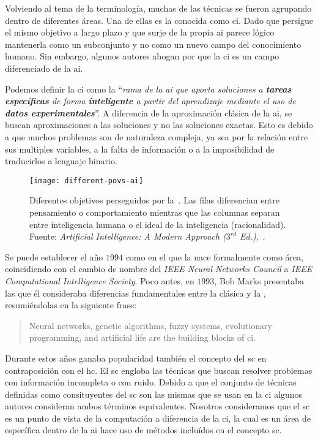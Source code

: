 Volviendo al tema de la terminología, muchas de las técnicas se fueron agrupando dentro de diferentes áreas. Una de ellas es la conocida como \acrlong{ci}. Dado que persigue el mismo objetivo a largo plazo y que surje de la propia \gls{ai} parece lógico mantenerla como un subconjunto y no como un nuevo campo del conocimiento humano. Sin embargo, algunos autores abogan por que la \gls{ci} es un campo diferenciado de la \gls{ai}.

Podemos definir la \acrlong{ci} como la \enquote{\textit{rama de la \gls{ai} que aporta soluciones a \textbf{tareas específicas} de forma \textbf{inteligente} a partir del aprendizaje mediante el uso de \textbf{datos experimentales}}}. A diferencia de la aproximación clásica de la \gls{ai}, se buscan aproximaciones a las soluciones y no las soluciones exactas. Esto es debido a que muchos problemas son de naturaleza compleja, ya sea por la relación entre sus multiples variables, a la falta de información o a la imposibilidad de traducirlos a lenguaje binario.

\begin{figure}
	\texttt{[image: different-povs-ai]}
	\caption[Diferentes objetivos perseguidos por la .]{Diferentes objetivos perseguidos por la~. Las filas diferencian entre pensamiento o comportamiento mientras que las columnas separan entre inteligencia humana o el ideal de la inteligencia (racionalidad). Fuente: \textit{Artificial Intelligence: A Modern Approach ($3^{rd}$ Ed.)},~\cite{russell2003artificial}.}
	\label{fig:different-povs-ai}
\end{figure}

Se puede establecer el año $1994$ como en el que la  nace formalmente como área, coincidiendo con el cambio de nombre del \textit{IEEE Neural Networks Council} a \textit{IEEE Computational Intelligence Society}. Poco antes, en $1993$, Bob Marks presentaba las que él consideraba diferencias fundamentales entre la  clásica y la , resumiéndolas en la siguiente frase:

\blockquote{Neural networks, genetic algorithms, fuzzy systems, evolutionary programming, and artificial life are the building blocks of \ac{ci}.}

Durante estos años ganaba popularidad también el concepto del \gls{sc} en contraposición con el \gls{hc}. El \gls{sc} engloba las técnicas que buscan resolver problemas con información incompleta o con ruido. Debido a que el conjunto de técnicas definidas como consituyentes del \gls{sc} son las mismas que se usan en la \gls{ci} algunos autores consideran ambos términos equivalentes. Nosotros consideramos que el \gls{sc} es un punto de vista de la computación a diferencia de la \gls{ci}, la cual es un área de específica dentro de la \gls{ai} hace uso de métodos incluídos en el concepto \gls{sc}.

